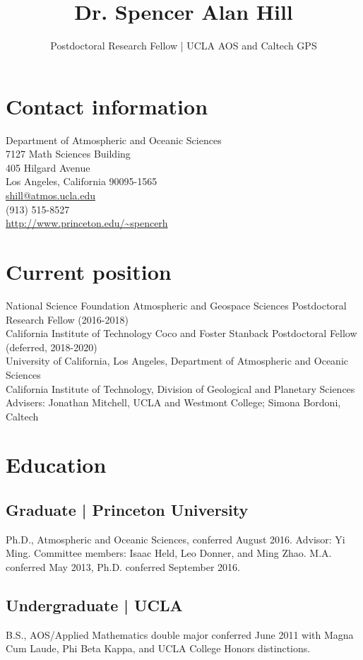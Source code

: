\documentclass{article}
\author{Postdoctoral Research Fellow | UCLA AOS and Caltech GPS}
\date{}
\title{Dr. Spencer Alan Hill}
\begin{document}
\maketitle
\section*{Contact information}
\label{sec:orgheadline1}
Department of Atmospheric and Oceanic Sciences\\
7127 Math Sciences Building\\
405 Hilgard Avenue\\
Los Angeles, California 90095-1565\\
\href{mailto:shill@atmos.ucla.edu}{shill@atmos.ucla.edu}\\
(913) 515-8527\\
\url{http://www.princeton.edu/~spencerh}
\section*{Current position}
\label{sec:orgheadline2}
National Science Foundation Atmospheric and Geospace Sciences Postdoctoral
Research Fellow (2016-2018)\\
California Institute of Technology Coco and Foster Stanback Postdoctoral Fellow
(deferred, 2018-2020)\\
University of California, Los Angeles, Department of Atmospheric and Oceanic
Sciences\\
California Institute of Technology, Division of Geological and Planetary
Sciences\\
Advisers: Jonathan Mitchell, UCLA and Westmont College; Simona Bordoni, Caltech\\
\section*{Education}
\label{sec:orgheadline5}
\subsection*{Graduate | Princeton University}
\label{sec:orgheadline3}
Ph.D., Atmospheric and Oceanic Sciences, conferred August 2016.  Advisor: Yi
Ming.  Committee members: Isaac Held, Leo Donner, and Ming Zhao.  M.A. conferred
May 2013, Ph.D. conferred September 2016.
\subsection*{Undergraduate | UCLA}
\label{sec:orgheadline4}
B.S., AOS/Applied Mathematics double major conferred June 2011 with
Magna Cum Laude, Phi Beta Kappa, and UCLA College Honors distinctions.
\end{document}
